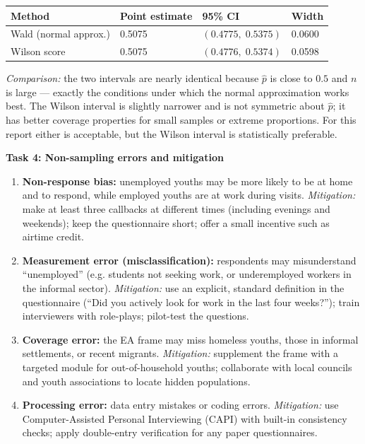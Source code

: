 \documentclass[11pt]{article}
\begin{document}
\begin{center}
\begin{tabularx}{\linewidth}{|l|X|X|X|}
\hline
\rowcolor{popblueL} \textbf{Method} & \textbf{Point estimate} & \textbf{95\% CI} & \textbf{Width} \\
\hline
Wald (normal approx.) & 0.5075 & $(0.4775,\;0.5375)$ & 0.0600 \\
\hline
Wilson score & 0.5075 & $(0.4776,\;0.5374)$ & 0.0598 \\
\hline
\end{tabularx}
\end{center}

\emph{Comparison:} the two intervals are nearly identical because $\hat{p}$ is close to $0.5$ and $n$ is large --- exactly the conditions under which the normal approximation works best. The Wilson interval is slightly narrower and is not symmetric about $\hat{p}$; it has better coverage properties for small samples or extreme proportions. For this report either is acceptable, but the Wilson interval is statistically preferable.

\textbf{Task 4: Non-sampling errors and mitigation}
\begin{enumerate}
    \item \textbf{Non-response bias:} unemployed youths may be more likely to be at home and to respond, while employed youths are at work during visits. \emph{Mitigation:} make at least three callbacks at different times (including evenings and weekends); keep the questionnaire short; offer a small incentive such as airtime credit.
    \item \textbf{Measurement error (misclassification):} respondents may misunderstand ``unemployed'' (e.g. students not seeking work, or underemployed workers in the informal sector). \emph{Mitigation:} use an explicit, standard definition in the questionnaire (``Did you actively look for work in the last four weeks?''); train interviewers with role-plays; pilot-test the questions.
    \item \textbf{Coverage error:} the EA frame may miss homeless youths, those in informal settlements, or recent migrants. \emph{Mitigation:} supplement the frame with a targeted module for out-of-household youths; collaborate with local councils and youth associations to locate hidden populations.
    \item \textbf{Processing error:} data entry mistakes or coding errors. \emph{Mitigation:} use Computer-Assisted Personal Interviewing (CAPI) with built-in consistency checks; apply double-entry verification for any paper questionnaires.
\end{enumerate}
\end{document}
